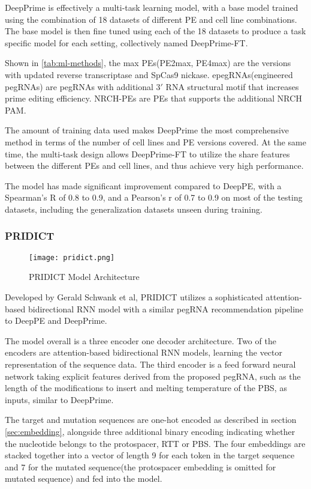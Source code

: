 \documentclass[12pt]{article}
\begin{document}
DeepPrime is effectively a multi-task learning model, with a base model trained using the combination of 18 datasets of different PE and cell line combinations. The base model is then fine tuned using each of the 18 datasets to produce a task specific model for each setting, collectively named DeepPrime-FT.  

Shown in \autoref{tab:ml-methods}, the max PEs(PE2max, PE4max) are the versions with updated reverse transcriptase and SpCas9 nickase. epegRNAs(engineered pegRNAs) are pegRNAs with additional $3'$ RNA structural motif that increases prime editing efficiency\cite{chenEnhancedPrimeEditing2021}. NRCH-PEs are PEs that supports the additional NRCH PAM.

The amount of training data used makes DeepPrime the most comprehensive method in terms of the number of cell lines and PE versions covered. At the same time, the multi-task design allows DeepPrime-FT to utilize the share features between the different PEs and cell lines, and thus achieve very high performance. 

The model has made significant improvement compared to DeepPE, with a Spearman's R of 0.8 to 0.9, and a Pearson's r of 0.7 to 0.9 on most of the testing datasets, including the generalization datasets unseen during training.

\subsubsection{PRIDICT}

\begin{figure}[ht]
    \centering
    \texttt{[image: pridict.png]}
    \caption{PRIDICT Model Architecture\cite{mathisPredictingPrimeEditing2023}}
    \label{fig:pridict}
\end{figure}


Developed by Gerald Schwank et al, PRIDICT utilizes a sophisticated attention-based bidirectional RNN model with a similar pegRNA recommendation pipeline to DeepPE and DeepPrime. 

The model overall is a three encoder one decoder architecture. Two of the encoders are attention-based bidirectional RNN models, learning the vector representation of the sequence data. The third encoder is a feed forward neural network taking explicit features derived from the proposed pegRNA, such as the length of the modifications to insert and melting temperature of the PBS, as inputs, similar to DeepPrime.

The target and mutation sequences are one-hot encoded as described in section \ref{sec:embedding}, alongside three additional binary encoding indicating whether the nucleotide belongs to the protospacer, RTT or PBS. The four embeddings are stacked together into a vector of length 9 for each token in the target sequence and 7 for the mutated sequence(the protospacer embedding is omitted for mutated sequence) and fed into the model.
\end{document}
